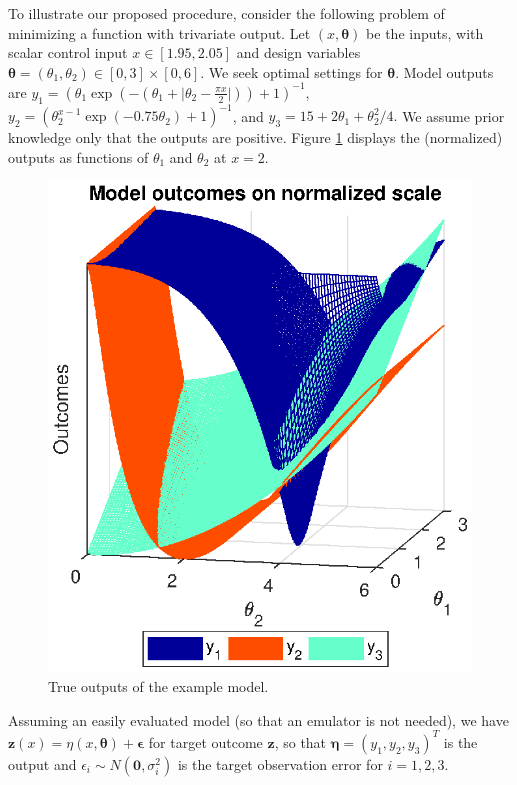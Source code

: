\documentclass[twocolumn,10pt]{asme2ej}
\begin{document}
%
To illustrate our proposed procedure, consider the following problem of minimizing a function with trivariate output. 
%
Let $(x,\boldsymbol \theta)$ be the inputs, with scalar control input $x\in[1.95,2.05]$ and design variables $\boldsymbol \theta = (\theta_1,\theta_2)\in[0,3]\times[0,6]$.
%
We seek optimal settings for $\boldsymbol\theta$.
%
Model outputs are
%
$
y_1 = \left(\theta_1 \exp\left(-\left(\theta_1 + \lvert \theta_2-\frac{\pi x}2\rvert \right)\right)+1\right)^{-1}$, 
$
y_2 = \left(\theta_2^{x-1} \exp\left(-0.75 \theta_2\right) + 1 \right)^{-1}
$, and
$
y_3 = 15 + 2 \theta_1 + {\theta_2^2}/4.
$
%
We assume prior knowledge only that the outputs are positive.
%
Figure \ref{fig:toy_sim_outputs} displays the (normalized) outputs as functions of $\theta_1$ and $\theta_2$ at $x = 2$.
%
\begin{figure}
	\centering
	\includegraphics[scale=.85]{FIG_toy_sim_model_outputs.eps}
	\caption{True outputs of the example model.}
	\label{fig:toy_sim_outputs}
\end{figure}
%
Assuming an easily evaluated model (so that an emulator is not needed), we have
%
$
\mathbf z(x) = \eta(x,\boldsymbol \theta) + \boldsymbol\epsilon
$
%
for target outcome $\mathbf z$, so that  $\boldsymbol\eta = (y_1,y_2,y_3)^T$ is the output and $\epsilon_i\sim N(\mathbf 0,\sigma_i^2)$ is the target observation error for $i=1,2,3$.
%
%
\end{document}
